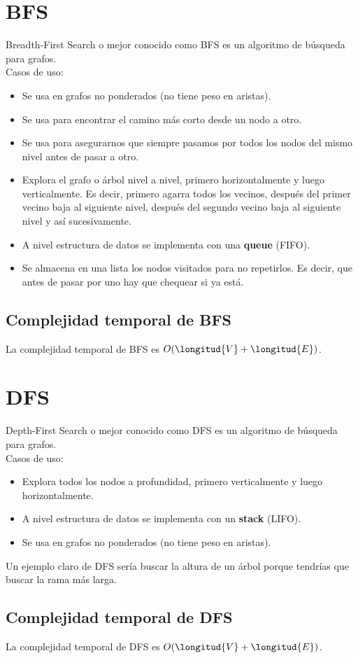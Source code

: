 \documentclass[10pt,a4paper]{article}
\begin{document}
\section*{BFS}
Breadth-First Search o mejor conocido como BFS es un algoritmo de búsqueda para grafos. \\
Casos de uso: 
\begin{itemize}
    \item Se usa en grafos no ponderados (no tiene peso en aristas).
    \item Se usa para encontrar el camino más corto desde un nodo a otro. 
    \item Se usa para asegurarnos que siempre pasamos por todos los nodos del mismo nivel antes de pasar a otro. 
    \item Explora el grafo o árbol nivel a nivel, primero horizontalmente y luego verticalmente. Es decir, primero agarra todos los vecinos, después del primer vecino baja al siguiente nivel, después del segundo vecino baja al siguiente nivel y así sucesivamente. 
    \item A nivel estructura de datos se implementa con una \textbf{queue} (FIFO).
    \item Se almacena en una lista los nodos visitados para no repetirlos. Es decir, que antes de pasar por uno hay que chequear si ya está.
\end{itemize}
\subsection*{Complejidad temporal de BFS}
La complejidad temporal de BFS es $O(\longitud{V} + \longitud{E})$. 
\section*{DFS}
Depth-First Search o mejor conocido como DFS es un algoritmo de búsqueda para grafos. \\
Casos de uso: 
\begin{itemize}
    \item Explora todos los nodos a profundidad, primero verticalmente y luego horizontalmente.
    \item A nivel estructura de datos se implementa con un \textbf{stack} (LIFO).
    \item Se usa en grafos no ponderados (no tiene peso en aristas).
\end{itemize}
Un ejemplo claro de DFS sería buscar la altura de un árbol porque tendrías que buscar la rama más larga.
\subsection*{Complejidad temporal de DFS}
La complejidad temporal de DFS es $O(\longitud{V} + \longitud{E})$.
\end{document}
